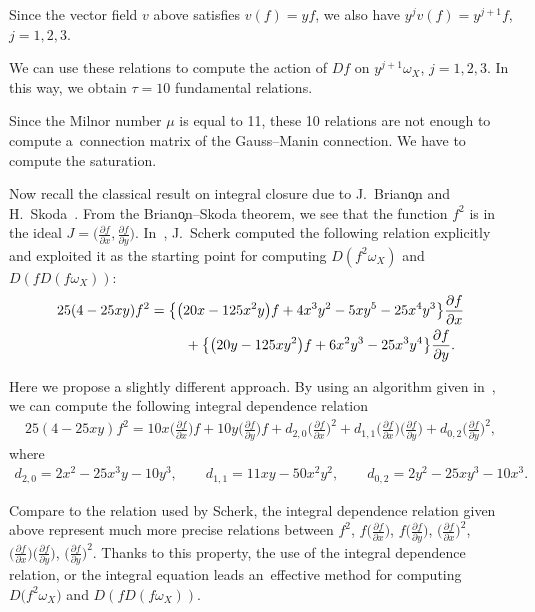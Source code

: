 \documentclass[pdftex]{sigma}%
\numberwithin{equation}{section}
\begin{document}
\begin{Example}
Since the vector field $v$ above satisfies $v(f) = yf$, we also have $y^jv(f) = y^{j+1}f$, $j=1,2,3$.

We can use these relations to compute the action of $Df$ on $y^{j+1} \omega_X$, $j=1,2,3$.
In this way, we obtain $\tau=10$ fundamental relations.


Since the Milnor number $\mu$ is equal to 11, these 10 relations are not enough to compute a~connection matrix of the Gauss--Manin connection.
We have to compute the saturation.

Now recall the classical result on integral closure due to J.~Brian\c on and H.~Skoda~\cite{BSkoda}.
From the Brian\c on--Skoda theorem, we see that the function $f^2$ is in the ideal
$J=\big(\frac{\partial f}{\partial x}, \frac{\partial f}{\partial y}\big)$.
In~\cite{Sch}, J.~Scherk computed the following relation explicitly and exploited it as the starting point for computing $D(f^2\omega_X)$ and $D(fD(f\omega_X))$:
\begin{gather*}
25(4-25xy)f^2 = \big\{\big(20x-125x^2y\big)f+4x^3y^2-5xy^5-25x^4y^3\big\}\frac{\partial f}{\partial x}
\\ \hphantom{25(4-25xy)f^2 = \{}{}
+ \big\{\big(20y-125xy^2\big)f+6x^2y^3-25x^3y^4\big\}\frac{\partial f}{\partial y}.
\end{gather*}

Here we propose a slightly different approach.
By using an algorithm given in~\cite{NT20}, we can compute the following integral dependence relation
\begin{gather*}
25(4-25xy)f^2 = 10x\bigg(\frac{\partial f}{\partial x}\bigg)f\!+\!10y\bigg(\frac{\partial f}{\partial y}\bigg)f\!+\!d_{2,0}\bigg(\frac{\partial f}{\partial x}\bigg)^2\!+\!d_{1,1}\bigg(\frac{\partial f}{\partial x}\bigg)\bigg(\frac{\partial f}{\partial y}\bigg)\!+\!d_{0,2}\bigg(\frac{\partial f}{\partial y}\bigg)^2,
\end{gather*}
where
\begin{gather*}
d_{2,0}=2x^2-25x^3y-10y^3, \qquad
d_{1,1}=11xy-50x^2y^2, \qquad
d_{0,2}=2y^2-25xy^3-10x^3.
\end{gather*}

Compare to the relation used by Scherk, the integral dependence relation given above represent much more precise relations between $f^2$, $f\big(\frac{\partial f}{\partial x}\big)$,
$f\big(\frac{\partial f}{\partial y}\big)$, $\big(\frac{\partial f}{\partial x}\big)^2$,
$\big(\frac{\partial f}{\partial x}\big)\big(\frac{\partial f}{\partial y}\big)$,
$\big(\frac{\partial f}{\partial y}\big)^2$. Thanks to this property,
the use of the integral dependence relation, or the integral equation leads an~effective method for computing $ D\big(f^2\omega_X\big) $ and $ D(fD(f\omega_X))$.
\end{Example}
\end{document}
